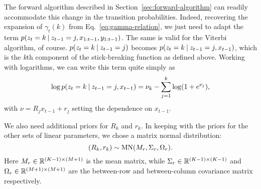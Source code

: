 \documentclass[
  10pt, twocolumn, headings=normal,
  footlines=1, DIV=calc
]{scrartcl}
\begin{document}
The forward algorithm described in Section~\ref{sec:forward-algorithm} can
readily accommodate this change in the transition probabilities. Indeed,
recovering the expansion of $\gamma_{t}(k)$ from Eq.~\eqref{eq:gamma-relation},
we just need to adapt the term $p(z_{t} = k \:\vert\: z_{t-1} = j, x_{1:t-1},
y_{1:t-1})$. The same is valid for the Viterbi algorithm, of course. $p(z_{t} =
k \:\vert\: z_{t-1} = j)$ becomes $p(z_{t} = k \:\vert\: z_{t-1} = j, x_{t-1})$, which
is the \emph{k}th component of the stick-breaking function as defined above.
Working with logarithms, we can write this term quite simply as
\begin{equation}
  \log p(z_{t} = k \:\vert\: z_{t-1} = j, x_{t-1}) = \nu_{k} - \sum_{j=1}^{k}
  \log(1 + e^{\nu_{j}}),
\end{equation}
with $\nu = R_{j}x_{t-1} + r_{j}$ setting the dependence on $x_{t-1}$.

We also need additional priors for $R_{k}$ and $r_{k}$. In keeping with the
priors for the other sets of linear parameters, we chose a matrix normal
distribution:
\begin{equation}
  (R_{k}, r_{k}) \sim \operatorname{MN}(M_{r}, \Sigma_{r}, \Omega_{r}).
\end{equation}
Here $M_{r} \in \mathbb{R}^{(K-1) \times (M+1)}$ is the mean matrix, while $\Sigma_{r}
\in \mathbb{R}^{(K-1) \times (K-1)}$ and $\Omega_{r} \in \mathbb{R}^{(M+1) \times (M+1)}$ are
the between-row and between-column covariance matrix respectively.

\printbibliography
\end{document}
